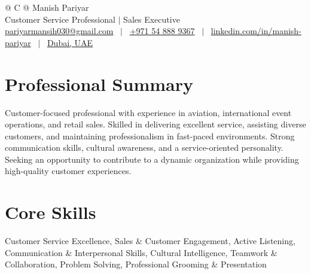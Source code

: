 \documentclass[a4paper,11pt]{article}
\begin{document}
\pagestyle{empty} 


\begin{tabularx}{\linewidth}{@{} C @{}} \Huge{Manish Pariyar} \\[4pt]
\large{Customer Service Professional $|$ Sales Executive} \\[4pt]
\href{mailto:pariyarmansih030@gmail.com}{pariyarmansih030@gmail.com} \ $|$ \ 
\href{tel:+971548889367}{+971 54 888 9367} \ $|$ \ 
\href{https://www.linkedin.com/in/manish-pariyar/}{linkedin.com/in/manish-pariyar} \ $|$ \ 
\href{https://maps.google.com/?q=Dubai,+UAE}{Dubai, UAE} \\
\end{tabularx}


\section{Professional Summary}
Customer-focused professional with experience in aviation, international event operations, and retail sales. Skilled in delivering excellent service, assisting diverse customers, and maintaining professionalism in fast-paced environments. Strong communication skills, cultural awareness, and a service-oriented personality. Seeking an opportunity to contribute to a dynamic organization while providing high-quality customer experiences.

\section{Core Skills}

Customer Service Excellence, Sales \& Customer Engagement, Active Listening, Communication \& Interpersonal Skills, Cultural Intelligence, Teamwork \& Collaboration, Problem Solving, Professional Grooming \& Presentation

\end{document}
